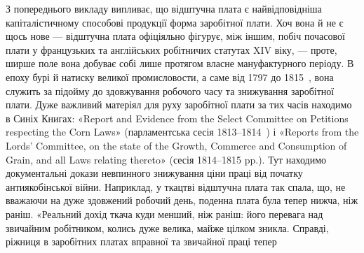 З попереднього викладу випливає, що відштучна плата є найвідповідніша
капіталістичному способові продукції форма заробітної
плати. Хоч вона й не є щось нове — відштучна плата офіціяльно
фігурує, між іншим, побіч почасової плати у французьких
та англійських робітничих статутах XIV віку, — проте, ширше
поле вона добуває собі лише протягом власне мануфактурного
періоду. В епоху бурі й натиску великої промисловости, а саме
від 1797 до 1815~, вона служить за підойму до здовжування
робочого часу та знижування заробітної плати. Дуже важливий
матеріял для руху заробітної плати за тих часів находимо в
Синіх Книгах: «Report and Evidence from the Select Committee
on Petitions respecting the Corn Laws» (парламентська сесія
1813--1814~) і «Reports from the Lords’ Committee, on the
state of the Growth, Commerce and Consumption of Grain, and
all Laws relating thereto» (сесія 1814--1815 pp.). Тут находимо
документальні докази невпинного знижування ціни праці від
початку антиякобінської війни. Наприклад, у ткацтві відштучна
плата так спала, що, не вважаючи на дуже здовжений робочий
день, поденна плата була тепер нижча, ніж раніш. «Реальний дохід
ткача куди менший, ніж раніш: його перевага над звичайним
робітником, колись дуже велика, майже цілком зникла. Справді,
ріжниця в заробітних платах вправної та звичайної праці тепер
\parbreak{}  %
